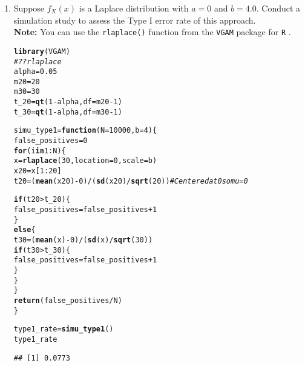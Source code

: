 \documentclass{article}\usepackage[]{graphicx}\usepackage[]{xcolor}
\makeatletter
\newcommand{\hlnum}[1]{\textcolor[rgb]{0.686,0.059,0.569}{#1}}%
\newcommand{\hlcom}[1]{\textcolor[rgb]{0.678,0.584,0.686}{\textit{#1}}}%
\newcommand{\hlopt}[1]{\textcolor[rgb]{0,0,0}{#1}}%
\newcommand{\hldef}[1]{\textcolor[rgb]{0.345,0.345,0.345}{#1}}%
\newcommand{\hlkwa}[1]{\textcolor[rgb]{0.161,0.373,0.58}{\textbf{#1}}}%
\newcommand{\hlkwb}[1]{\textcolor[rgb]{0.69,0.353,0.396}{#1}}%
\newcommand{\hlkwc}[1]{\textcolor[rgb]{0.333,0.667,0.333}{#1}}%
\newcommand{\hlkwd}[1]{\textcolor[rgb]{0.737,0.353,0.396}{\textbf{#1}}}%
\newenvironment{kframe}{%
 \def\at@end@of@kframe{}%
 \ifinner\ifhmode%
  \def\at@end@of@kframe{\end{minipage}}%
  \begin{minipage}{\columnwidth}%
 \fi\fi%
 \def\FrameCommand##1{\hskip\@totalleftmargin \hskip-\fboxsep
 \colorbox{shadecolor}{##1}\hskip-\fboxsep
     \hskip-\linewidth \hskip-\@totalleftmargin \hskip\columnwidth}%
 \MakeFramed {\advance\hsize-\width
   \@totalleftmargin\z@ \linewidth\hsize
   \@setminipage}}%
 {\par\unskip\endMakeFramed%
 \at@end@of@kframe}
\newenvironment{knitrout}{}{} %
\makeatother
\begin{document}
\begin{enumerate}
\begin{enumerate}
  \item Suppose $f_X(x)$ is a Laplace distribution with $a=0$ and $b=4.0$.
  Conduct a simulation study to assess the Type I error rate of this approach.\\
  \textbf{Note:} You can use the \texttt{rlaplace()} function from the \texttt{VGAM}
  package for \texttt{R} \citep{VGAM}.
\begin{knitrout}
\color{fgcolor}\begin{kframe}
\begin{alltt}
\hlkwd{library}\hldef{(VGAM)}
\hlcom{#??rlaplace}
\hldef{alpha} \hlkwb{=} \hlnum{0.05}
\hldef{m20} \hlkwb{=} \hlnum{20}
\hldef{m30} \hlkwb{=} \hlnum{30}
\hldef{t_20} \hlkwb{=} \hlkwd{qt}\hldef{(}\hlnum{1}\hlopt{-}\hldef{alpha,} \hlkwc{df} \hldef{= m20}\hlopt{-}\hlnum{1}\hldef{)}
\hldef{t_30} \hlkwb{=} \hlkwd{qt}\hldef{(}\hlnum{1}\hlopt{-}\hldef{alpha,} \hlkwc{df} \hldef{= m30}\hlopt{-}\hlnum{1}\hldef{)}

\hldef{simu_type1} \hlkwb{=} \hlkwa{function}\hldef{(}\hlkwc{N} \hldef{=} \hlnum{10000}\hldef{,} \hlkwc{b} \hldef{=} \hlnum{4}\hldef{)\{}
  \hldef{false_positives} \hlkwb{=} \hlnum{0}
  \hlkwa{for} \hldef{(i} \hlkwa{in} \hlnum{1}\hlopt{:}\hldef{N)\{}
    \hldef{x} \hlkwb{=} \hlkwd{rlaplace}\hldef{(}\hlnum{30}\hldef{,} \hlkwc{location} \hldef{=} \hlnum{0}\hldef{,} \hlkwc{scale} \hldef{= b)}
    \hldef{x20} \hlkwb{=} \hldef{x[}\hlnum{1}\hlopt{:}\hlnum{20}\hldef{]}
    \hldef{t20} \hlkwb{=} \hldef{(}\hlkwd{mean}\hldef{(x20)} \hlopt{-} \hlnum{0}\hldef{)} \hlopt{/} \hldef{(}\hlkwd{sd}\hldef{(x20)}\hlopt{/}\hlkwd{sqrt}\hldef{(}\hlnum{20}\hldef{))} \hlcom{# Centered at 0 so mu = 0}

    \hlkwa{if} \hldef{(t20} \hlopt{>} \hldef{t_20)\{}
      \hldef{false_positives} \hlkwb{=} \hldef{false_positives} \hlopt{+} \hlnum{1}
    \hldef{\}}
    \hlkwa{else} \hldef{\{}
      \hldef{t30} \hlkwb{=} \hldef{(}\hlkwd{mean}\hldef{(x)} \hlopt{-} \hlnum{0}\hldef{)} \hlopt{/} \hldef{(}\hlkwd{sd}\hldef{(x)}\hlopt{/}\hlkwd{sqrt}\hldef{(}\hlnum{30}\hldef{))}
      \hlkwa{if} \hldef{(t30} \hlopt{>} \hldef{t_30)\{}
        \hldef{false_positives} \hlkwb{=} \hldef{false_positives} \hlopt{+} \hlnum{1}
      \hldef{\}}
    \hldef{\}}
  \hldef{\}}
  \hlkwd{return}\hldef{(false_positives} \hlopt{/} \hldef{N)}
\hldef{\}}

\hldef{type1_rate} \hlkwb{=} \hlkwd{simu_type1}\hldef{()}
\hldef{type1_rate}
\end{alltt}
\begin{verbatim}
## [1] 0.0773
\end{verbatim}
\end{kframe}
\end{knitrout}
  

\end{enumerate}
\end{enumerate}
\end{document}
